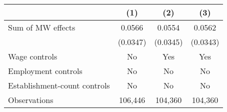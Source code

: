 {
\def\sym#1{\ifmmode^{#1}\else\(^{#1}\)\fi}
\begin{tabular}{l*{3}{c}}
\hline\hline
          &\multicolumn{1}{c}{(1)}         &\multicolumn{1}{c}{(2)}         &\multicolumn{1}{c}{(3)}         \\
\hline
Sum of MW effects&   0.0566         &   0.0554         &   0.0562         \\
          & (0.0347)         & (0.0345)         & (0.0343)         \\
\hline
Wage controls&       No         &      Yes         &      Yes         \\
Employment controls&       No         &       No         &       No         \\
Establishment-count controls&       No         &       No         &       No         \\
Observations&  106,446         &  104,360         &  104,360         \\
\hline\hline
\end{tabular}
}
